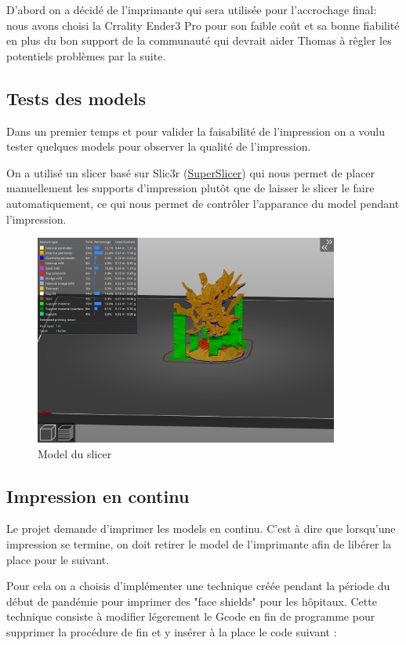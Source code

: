 \documentclass[oneside,a4paper,12pt]{article}
\begin{document}
	D'abord on a décidé de l'imprimante qui sera utilisée pour l'accrochage final: nous avons choisi la Crrality Ender3 Pro pour son faible coût et sa bonne fiabilité en plus du bon support de la communauté qui devrait aider Thomas à rêgler les potentiels problèmes par la suite.
	
	\subsection{Tests des models}
	
	Dans un premier temps et pour valider la faisabilité de l'impression on a voulu tester quelques models pour observer la qualité de l'impression.
	
	On a utilisé un slicer basé sur Slic3r (\href{https://github.com/RotBotSlicer/Transform}{SuperSlicer}) qui nous permet de placer manuellement les supports d'impression plutôt que de laisser le slicer le faire automatiquement, ce qui nous permet de contrôler l'apparance du model pendant l'impression.
	
	\begin{figure}[h]
		\centering
		\includegraphics[width=10cm]{superslicer.png}
		\caption{Model du slicer}	
	\end{figure}
	
	\subsection{Impression en continu}
	
	Le projet demande d'imprimer les models en continu. C'est à dire que lorsqu'une impression se termine, on doit retirer le model de l'imprimante afin de libérer la place pour le suivant.
	
	Pour cela on a choisis d'implémenter une technique créée pendant la période du début de pandémie pour imprimer des "face shields" pour les hôpitaux. Cette technique consiste à modifier légerement le Gcode en fin de programme pour supprimer la procédure de fin et y insérer à la place le code suivant :
	
\end{document}

